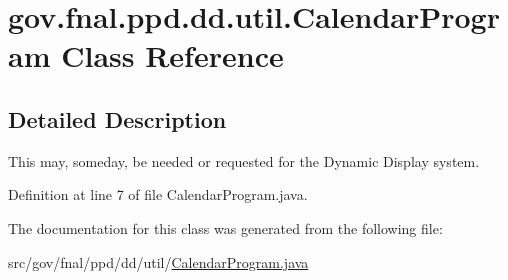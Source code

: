 \hypertarget{classgov_1_1fnal_1_1ppd_1_1dd_1_1util_1_1CalendarProgram}{\section{gov.\-fnal.\-ppd.\-dd.\-util.\-Calendar\-Program Class Reference}
\label{classgov_1_1fnal_1_1ppd_1_1dd_1_1util_1_1CalendarProgram}
}


\subsection{Detailed Description}
This may, someday, be needed or requested for the Dynamic Display system. 

Definition at line 7 of file Calendar\-Program.\-java.



The documentation for this class was generated from the following file\-:\begin{DoxyCompactItemize}
\item 
src/gov/fnal/ppd/dd/util/\hyperlink{CalendarProgram_8java}{Calendar\-Program.\-java}\end{DoxyCompactItemize}
